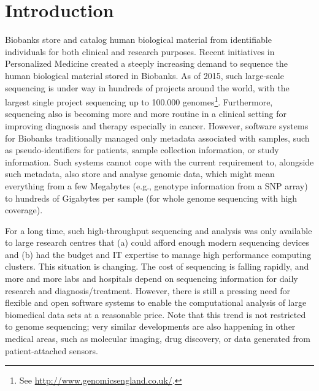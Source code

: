 
\section{Introduction}
Biobanks store and catalog human biological material from identifiable individuals for both clinical and research purposes. Recent initiatives in Personalized Medicine created a steeply increasing demand to sequence the human biological material stored in Biobanks. As of 2015, such large-scale sequencing is under way in hundreds of projects around the world, with the largest single project sequencing up to 100.000 genomes\footnote{See \url{http://www.genomicsengland.co.uk/}.}. Furthermore, sequencing also is becoming more and more routine in a clinical setting for improving diagnosis and therapy especially in cancer\cite{pmedicine}. However, software systems for Biobanks traditionally managed only metadata associated with samples, such as pseudo-identifiers for patients, sample collection information, or study information. Such systems cannot cope with the current requirement to, alongside such metadata, also store and analyse genomic data, which might mean everything from a few Megabytes (e.g., genotype information from a SNP array) to hundreds of Gigabytes per sample (for whole genome sequencing with high coverage). 

For a long time, such high-throughput sequencing and analysis was only available to large research centres that (a) could afford enough modern sequencing devices and (b) had the budget and IT expertise to manage high performance computing clusters. This situation is changing. The cost of sequencing is falling rapidly, and more and more labs and hospitals depend on sequencing information for daily research and diagnosis/treatment. However, there is still a pressing need for flexible and open software systems to enable the computational analysis of large biomedical data sets at a reasonable price. Note that this trend is not restricted to genome sequencing; very similar developments are also happening in other medical areas, such as molecular imaging\cite{imaging}, drug discovery\cite{drug}, or data generated from patient-attached sensors\cite{qself}. 

